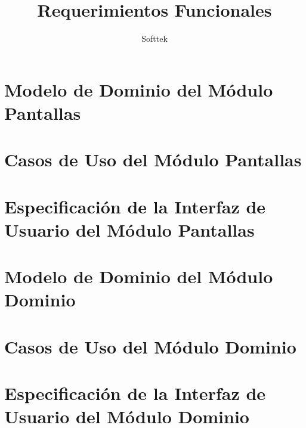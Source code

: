 \documentclass[10pt, letterpaper]{report}
\begin{document}
\title{Requerimientos Funcionales}
\author{Softtek}
\date{}




\pagestyle{plain}
\tableofcontents

\pagestyle{fancy}
\fancyhf{}
\fancyhead[OC]{\leftmark}
\fancyhead[EC]{\rightmark}
\cfoot{\thepage}
\chapter{Modelo de Dominio del M\'odulo Pantallas}
\clearpage


\chapter{Casos de Uso del M\'odulo Pantallas}


\chapter{Especificaci\'on de la Interfaz de Usuario del M\'odulo Pantallas}

\chapter{Modelo de Dominio del M\'odulo Dominio}
\clearpage


\chapter{Casos de Uso del M\'odulo Dominio}


\chapter{Especificaci\'on de la Interfaz de Usuario del M\'odulo Dominio}

\printglossary
\end{document}

